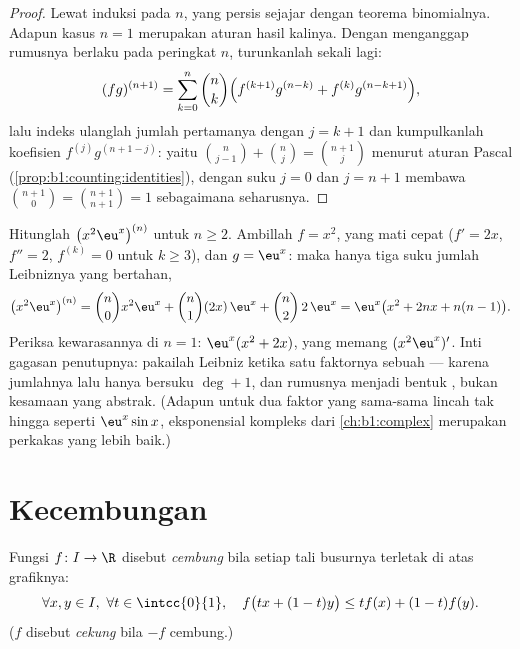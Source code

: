 \begin{proof}
Lewat induksi pada $n$, yang persis sejajar dengan teorema binomialnya. Adapun
kasus $n = 1$ merupakan aturan hasil kalinya. Dengan menganggap rumusnya berlaku pada peringkat
$n$, turunkanlah sekali lagi:
\[
(fg)^{(n+1)} = \sum_{k=0}^{n} \binom nk
\Bigl( f^{(k+1)} g^{(n-k)} + f^{(k)} g^{(n-k+1)} \Bigr),
\]
lalu indeks ulanglah jumlah pertamanya dengan $j = k + 1$ dan kumpulkanlah
koefisien $f^{(j)} g^{(n+1-j)}$: yaitu $\binom{n}{j-1} +
\binom nj = \binom{n+1}{j}$ menurut aturan Pascal
(\cref{prop:b1:counting:identities}), dengan suku  $j = 0$
dan $j = n + 1$ membawa $\binom{n+1}{0} = \binom{n+1}{n+1} =
1$ sebagaimana seharusnya.
\end{proof}

\begin{example}\label{ex:b1:derivative:leibnizaction}
Hitunglah $\bigl(x^2 \eu^x\bigr)^{(n)}$ untuk $n \geq 2$. Ambillah $f =
x^2$, yang  mati cepat ($f' = 2x$, $f'' = 2$,
$f^{(k)} = 0$ untuk $k \geq 3$), dan $g = \eu^x$: maka hanya tiga suku
jumlah Leibniznya yang bertahan,
\[
\bigl(x^2\eu^x\bigr)^{(n)}
= \binom n0 x^2 \eu^x + \binom n1 (2x)\,\eu^x + \binom n2\,
2\,\eu^x
= \eu^x\bigl(x^2 + 2nx + n(n-1)\bigr).
\]
Periksa kewarasannya di $n = 1$: $\eu^x(x^2 + 2x)$, yang memang
$(x^2\eu^x)'$. Inti gagasan penutupnya: pakailah Leibniz ketika satu faktornya
sebuah  --- karena jumlahnya lalu hanya bersuku $\deg + 1$, dan
rumusnya menjadi bentuk , bukan kesamaan yang abstrak. (Adapun untuk dua
faktor yang sama-sama lincah tak hingga seperti $\eu^x\sin x$, eksponensial
kompleks dari \cref{ch:b1:complex} merupakan perkakas yang lebih baik.)
\end{example}

\section{Kecembungan}

\begin{definition}\label{def:b1:derivative:convex}
Fungsi $f \colon I \to \R$ disebut \emph{cembung} bila
setiap tali busurnya terletak di atas grafiknya:
\[
\forall x, y \in I,\ \forall t \in \intcc{0}{1}, \quad
f\bigl(tx + (1-t)y\bigr) \leq t f(x) + (1-t) f(y).
\]
($f$ disebut \emph{cekung} bila $-f$ cembung.)
\end{definition}

